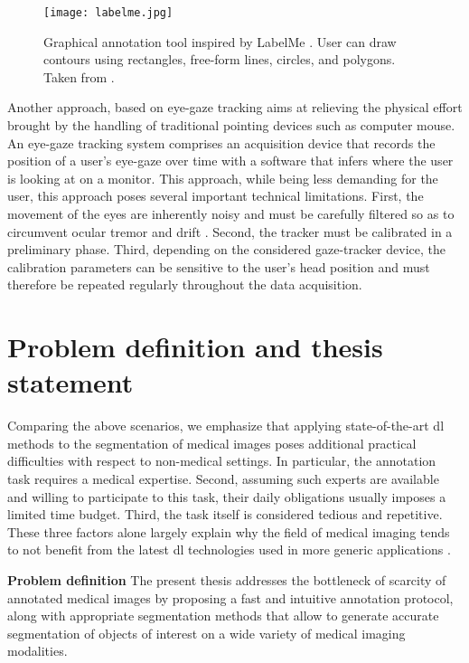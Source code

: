 \begin{figure}[!htpb]
  \texttt{[image: labelme.jpg]}
  \caption{Graphical annotation tool inspired by LabelMe \cite{russell08}. User can draw contours
  using rectangles, free-form lines, circles, and polygons. Taken from \cite{labelme16}.}
  \label{fig:labelme}
\end{figure}

Another approach, based on eye-gaze tracking aims at relieving the physical effort brought by
the handling of traditional pointing devices such as computer mouse.
An eye-gaze tracking system comprises an acquisition device that records the
position of a user's eye-gaze over time with a
software that infers where the user is looking at on a monitor.
This approach, while being less demanding for the user, this approach poses several important technical limitations.
First, the movement of the eyes are inherently noisy and must be carefully filtered
so as to circumvent ocular tremor and drift \cite{niehorster21}.
Second, the tracker must be calibrated in a preliminary phase.
Third, depending on the considered gaze-tracker device, the calibration parameters can be sensitive to
the user's head position and must therefore be repeated regularly throughout the data acquisition.


\section{Problem definition and thesis statement}

Comparing the above scenarios, we emphasize that applying state-of-the-art \gls{dl} methods to the segmentation of medical images poses additional practical difficulties with respect to non-medical settings.
In particular, the annotation task requires a medical expertise.
Second, assuming such experts are available and willing to participate to this task, their daily obligations usually imposes a limited time budget.
Third, the task itself is considered tedious and repetitive.
These three factors alone largely explain why the field of medical imaging tends to not benefit from the latest \gls{dl} technologies used in more generic applications \cite{orting19}.

\textbf{Problem definition}
The present thesis addresses the bottleneck of scarcity of annotated medical images by proposing a fast and intuitive annotation protocol, along with appropriate segmentation methods that allow to generate accurate segmentation of objects of interest on a wide variety of medical imaging modalities.

